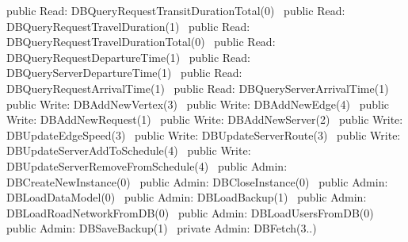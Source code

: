 public \LA{}Read: DBQueryRequestTransitDurationTotal(0)~{\nwtagstyle{}}\RA{}
public \LA{}Read: DBQueryRequestTravelDuration(1)~{\nwtagstyle{}}\RA{}
public \LA{}Read: DBQueryRequestTravelDurationTotal(0)~{\nwtagstyle{}}\RA{}
public \LA{}Read: DBQueryRequestDepartureTime(1)~{\nwtagstyle{}}\RA{}
public \LA{}Read: DBQueryServerDepartureTime(1)~{\nwtagstyle{}}\RA{}
public \LA{}Read: DBQueryRequestArrivalTime(1)~{\nwtagstyle{}}\RA{}
public \LA{}Read: DBQueryServerArrivalTime(1)~{\nwtagstyle{}}\RA{}
\nwendcode{}\nwdocspar
{}
\nwenddocs{}\plusendmoddef
public \LA{}Write: DBAddNewVertex(3)~{\nwtagstyle{}}\RA{}
public \LA{}Write: DBAddNewEdge(4)~{\nwtagstyle{}}\RA{}
public \LA{}Write: DBAddNewRequest(1)~{\nwtagstyle{}}\RA{}
public \LA{}Write: DBAddNewServer(2)~{\nwtagstyle{}}\RA{}
public \LA{}Write: DBUpdateEdgeSpeed(3)~{\nwtagstyle{}}\RA{}
public \LA{}Write: DBUpdateServerRoute(3)~{\nwtagstyle{}}\RA{}
public \LA{}Write: DBUpdateServerAddToSchedule(4)~{\nwtagstyle{}}\RA{}
public \LA{}Write: DBUpdateServerRemoveFromSchedule(4)~{\nwtagstyle{}}\RA{}
\nwendcode{}\nwdocspar
{}
\nwenddocs{}\plusendmoddef
public \LA{}Admin: DBCreateNewInstance(0)~{\nwtagstyle{}}\RA{}
public \LA{}Admin: DBCloseInstance(0)~{\nwtagstyle{}}\RA{}
public \LA{}Admin: DBLoadDataModel(0)~{\nwtagstyle{}}\RA{}
public \LA{}Admin: DBLoadBackup(1)~{\nwtagstyle{}}\RA{}
public \LA{}Admin: DBLoadRoadNetworkFromDB(0)~{\nwtagstyle{}}\RA{}
public \LA{}Admin: DBLoadUsersFromDB(0)~{\nwtagstyle{}}\RA{}
public \LA{}Admin: DBSaveBackup(1)~{\nwtagstyle{}}\RA{}
private \LA{}Admin: DBFetch(3..)~{\nwtagstyle{}}\RA{}
